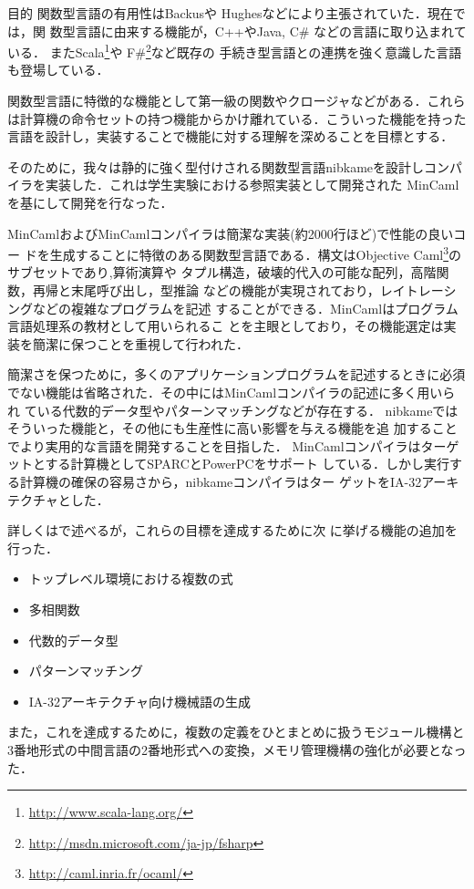 \documentclass[a4paper,titlepage,report,disablejfam]{jsbook}
\begin{document}
\begin{resbonsiblesection}{目的}{\kobori}
関数型言語の有用性はBackus\cite{Backus:1978:PLV:359576.359579}や
Hughes\cite{hughes1989functional}などにより主張されていた．現在では，関
数型言語に由来する機能が，C++やJava, C\# などの言語に取り込まれている．
またScala\footnote{\url{http://www.scala-lang.org/}}や
F\#{}\footnote{\url{http://msdn.microsoft.com/ja-jp/fsharp}}など既存の
手続き型言語との連携を強く意識した言語も登場している．

関数型言語に特徴的な機能として第一級の関数やクロージャなどがある．これら
は計算機の命令セットの持つ機能からかけ離れている．こういった機能を持った
言語を設計し，実装することで機能に対する理解を深めることを目標とする．

そのために，我々は静的に強く型付けされる関数型言語nibkameを設計しコンパ
イラを実装した．これは学生実験における参照実装として開発された
MinCaml\cite{住井英二郎:2008-04-24}を基にして開発を行なった．

MinCamlおよびMinCamlコンパイラは簡潔な実装(約2000行ほど)で性能の良いコー
ドを生成することに特徴のある関数型言語である．構文はObjective
Caml\footnote{\url{http://caml.inria.fr/ocaml/}}のサブセットであり,算術演算や
タプル構造，破壊的代入の可能な配列，高階関数，再帰と末尾呼び出し，型推論
などの機能が実現されており，レイトレーシングなどの複雑なプログラムを記述
することができる．MinCamlはプログラム言語処理系の教材として用いられるこ
とを主眼としており，その機能選定は実装を簡潔に保つことを重視して行われた．

簡潔さを保つために，多くのアプリケーションプログラムを記述するときに必須
でない機能は省略された．その中にはMinCamlコンパイラの記述に多く用いられ
ている代数的データ型やパターンマッチングなどが存在する．
nibkameではそういった機能と，その他にも生産性に高い影響を与える機能を追
加することでより実用的な言語を開発することを目指した．
MinCamlコンパイラはターゲットとする計算機としてSPARCとPowerPCをサポート
している．しかし実行する計算機の確保の容易さから，nibkameコンパイラはター
ゲットをIA-32アーキテクチャとした．

詳しくはで述べるが，これらの目標を達成するために次
に挙げる機能の追加を行った．
\begin{itemize}
 \item トップレベル環境における複数の式
 \item 多相関数
 \item 代数的データ型
 \item パターンマッチング
 \item IA-32アーキテクチャ向け機械語の生成
\end{itemize}
また，これを達成するために，複数の定義をひとまとめに扱うモジュール機構と
3番地形式の中間言語の2番地形式への変換，メモリ管理機構の強化が必要となっ
た．
\end{resbonsiblesection}
\end{document}
